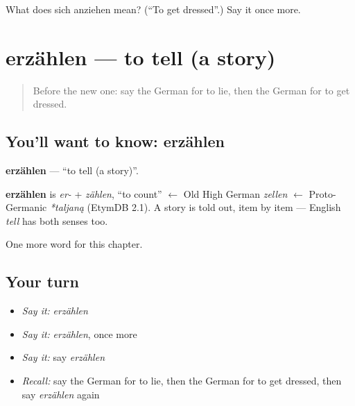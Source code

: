 \begin{tcolorbox}[breakable,colback=teal!4,colframe=teal!35!black,title={Before you move on}]
What does sich anziehen mean? (\textquotedblleft{}To get dressed\textquotedblright{}.) Say it once more.
\end{tcolorbox}
\section[erzählen]{erzählen — to tell (a story)}

\label{lesson:GE-C140-erzaehlen}



\begin{quote}
Before the new one: say the German for to lie, then the German for to get dressed.
\end{quote}

\subsection*{You'll want to know: erzählen}
\textbf{erzählen} — \textquotedblleft{}to tell (a story)\textquotedblright{}.

\begin{cousinweb}
\textbf{erzählen} is \emph{er-} + \emph{zählen}, \textquotedblleft{}to count\textquotedblright{} $\leftarrow$ Old High German \emph{zellen} $\leftarrow$ Proto-Germanic \emph{*taljaną} (EtymDB 2.1). A story is told out, item by item — English \emph{tell} has both senses too.
\end{cousinweb}

\begin{grammarlens}[title={What you've built}]
One more word for this chapter.
\end{grammarlens}

\subsection*{Your turn}
\begin{itemize}
\raggedright
  \item \emph{Say it:} \emph{erzählen}
  \item \emph{Say it:} \emph{erzählen}, once more
  \item \emph{Say it:} say \emph{erzählen}
  \item \emph{Recall:} say the German for to lie, then the German for to get dressed, then say \emph{erzählen} again
\end{itemize}

